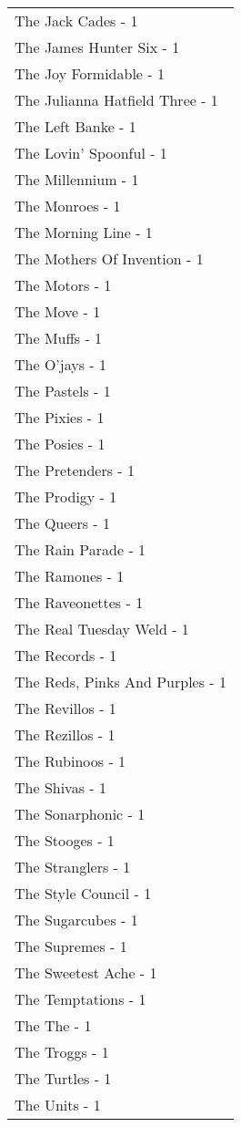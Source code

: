 \documentclass[
]{article}
\begin{document}
\begin{longtable}{l}
The Jack Cades - 1 \\ 
The James Hunter Six - 1 \\ 
The Joy Formidable - 1 \\ 
The Julianna Hatfield Three - 1 \\ 
The Left Banke - 1 \\ 
The Lovin' Spoonful - 1 \\ 
The Millennium - 1 \\ 
The Monroes - 1 \\ 
The Morning Line - 1 \\ 
The Mothers Of Invention - 1 \\ 
The Motors - 1 \\ 
The Move - 1 \\ 
The Muffs - 1 \\ 
The O'jays - 1 \\ 
The Pastels - 1 \\ 
The Pixies - 1 \\ 
The Posies - 1 \\ 
The Pretenders - 1 \\ 
The Prodigy - 1 \\ 
The Queers - 1 \\ 
The Rain Parade - 1 \\ 
The Ramones - 1 \\ 
The Raveonettes - 1 \\ 
The Real Tuesday Weld - 1 \\ 
The Records - 1 \\ 
The Reds, Pinks And Purples - 1 \\ 
The Revillos - 1 \\ 
The Rezillos - 1 \\ 
The Rubinoos - 1 \\ 
The Shivas - 1 \\ 
The Sonarphonic - 1 \\ 
The Stooges - 1 \\ 
The Stranglers - 1 \\ 
The Style Council - 1 \\ 
The Sugarcubes - 1 \\ 
The Supremes - 1 \\ 
The Sweetest Ache - 1 \\ 
The Temptations - 1 \\ 
The The - 1 \\ 
The Troggs - 1 \\ 
The Turtles - 1 \\ 
The Units - 1 \\ 

\end{longtable}
\end{document}
